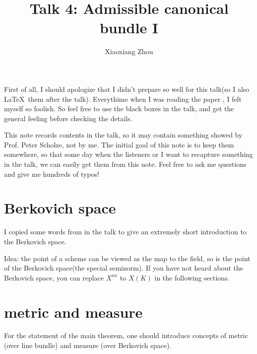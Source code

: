 \documentclass[reqno,11pt]{amsart}
\numberwithin{equation}{section}
\theoremstyle{plain}
\theoremstyle{plain}
\numberwithin{equation}{section}
\theoremstyle{remark}
\begin{document}
\date{}

\title
{Talk 4: Admissible canonical bundle I
}


\author{Xiaoxiang Zhou}
\address{School of Mathematical Sciences\\
University of Bonn\\
Bonn, 53115\\ Germany\\} 



\setcounter{tocdepth}{1}
\maketitle
\tableofcontents

First of all, I should apologize that I didn't prepare so well for this talk(so I also \LaTeX$\,$ them after the talk). Everythime when I was reading the paper \cite{yuan2021arithmetic}, I felt myself so foolish. So feel free to use the black boxes in the talk, and get the general feeling before checking the details.

This note records contents in the talk, so it may contain something showed by Prof. Peter Scholze, not by me. The initial goal of this note is to keep them somewhere, so that some day when the listeners or I want to recapture something in the talk, we can easily get them from this note. Feel free to ask me questions and give me hundreds of typos!

\section{Berkovich space}

I copied some words from \cite[3.1.1]{yuan2021arithmetic} in the talk to give an extremely short introduction to the Berkovich space. 

Idea: the point of a scheme can be viewed as the map to the field, so is the point of the Berkovich space(the special seminorm). If you have not heard about the Berkovich space, you can replace $X^{an}$ to $X(K)$ in the following sections.

\section{metric and measure}
For the statement of the main theorem, one should introduce concepts of metric (over line bundle) and measure (over Berkovich space).
\end{document}
